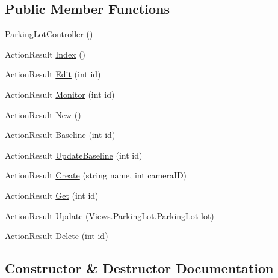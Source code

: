 \subsection*{Public Member Functions}
\begin{DoxyCompactItemize}
\item 
\mbox{\hyperlink{class_eagle_eye_1_1_controllers_1_1_parking_lot_controller_a6cb8c923ba943aca4683d60d1585806d}{Parking\+Lot\+Controller}} ()
\item 
Action\+Result \mbox{\hyperlink{class_eagle_eye_1_1_controllers_1_1_parking_lot_controller_a5015c903ed00613edaec0fed1c2d4847}{Index}} ()
\item 
Action\+Result \mbox{\hyperlink{class_eagle_eye_1_1_controllers_1_1_parking_lot_controller_a4c61e3d4b7e032a616e0624bf79fbba8}{Edit}} (int id)
\item 
Action\+Result \mbox{\hyperlink{class_eagle_eye_1_1_controllers_1_1_parking_lot_controller_a3e05e24a69a4c1c646c67003a00b632b}{Monitor}} (int id)
\item 
Action\+Result \mbox{\hyperlink{class_eagle_eye_1_1_controllers_1_1_parking_lot_controller_a15e34fac7a5623494db6ac9ef11e7021}{New}} ()
\item 
Action\+Result \mbox{\hyperlink{class_eagle_eye_1_1_controllers_1_1_parking_lot_controller_a2a8a2327d686b2b8aeb95bfd8f527326}{Baseline}} (int id)
\item 
Action\+Result \mbox{\hyperlink{class_eagle_eye_1_1_controllers_1_1_parking_lot_controller_a073d77794ca654b813b37deae908501a}{Update\+Baseline}} (int id)
\item 
Action\+Result \mbox{\hyperlink{class_eagle_eye_1_1_controllers_1_1_parking_lot_controller_a5af6a4b208418bca8a26f30255c62926}{Create}} (string name, int camera\+ID)
\item 
Action\+Result \mbox{\hyperlink{class_eagle_eye_1_1_controllers_1_1_parking_lot_controller_ab3bd9c4d1c40c73a214475198aa74039}{Get}} (int id)
\item 
Action\+Result \mbox{\hyperlink{class_eagle_eye_1_1_controllers_1_1_parking_lot_controller_aa0484b67b0469d5c81421d793405ac50}{Update}} (\mbox{\hyperlink{class_eagle_eye_1_1_views_1_1_parking_lot_1_1_parking_lot}{Views.\+Parking\+Lot.\+Parking\+Lot}} lot)
\item 
Action\+Result \mbox{\hyperlink{class_eagle_eye_1_1_controllers_1_1_parking_lot_controller_aa26300d7c8f2fa2e41c15ceb0eb5c79e}{Delete}} (int id)
\end{DoxyCompactItemize}


\subsection{Constructor \& Destructor Documentation}
\mbox{\label{class_eagle_eye_1_1_controllers_1_1_parking_lot_controller_a6cb8c923ba943aca4683d60d1585806d}} 
